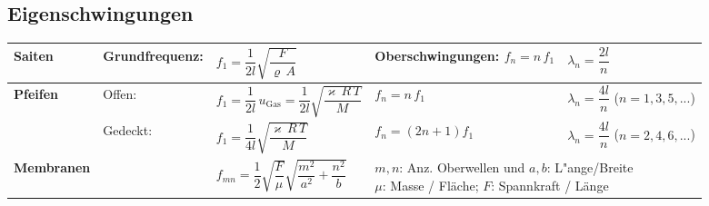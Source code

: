 \subsection{Eigenschwingungen  }
\renewcommand{\arraystretch}{2.7}
\begin{tabular}{|l|llll|}
\hline
\textbf{Saiten}
	& Grundfrequenz: 
	& $ f_1=\dfrac{1}{2l}\sqrt{\dfrac{F}{\varrho\,A}}$
	& Oberschwingungen: $ f_n=n\, f_1$
	& $\lambda_n=\dfrac{2l}{n}$\\
\hline
\textbf{Pfeifen} & Offen:
 	& $f_1=\dfrac{1}{2l}\,u_{\text{Gas}}=\dfrac{1}{2l}\sqrt{\dfrac{\varkappa\,R\,T}{M}}$ 
	& $f_n=n\, f_1$
	& $\lambda_n=\dfrac{4l}{n}$ \quad ($n=1,3,5,...$) \\
& Gedeckt: 
 	& $ f_1=\dfrac{1}{4l}\sqrt{\dfrac{\varkappa\,R\,T}{M}}$
	& $f_n=(2n+1) f_1$
	& $\lambda_n=\dfrac{4l}{n}$ \quad ($n=2,4,6,...$) \\ 
\hline
\textbf{Membranen}
 	& &
 	$f_{mn}=\dfrac{1}{2}\sqrt{\dfrac{F}{\mu}}\sqrt{\dfrac{m^2}{a^2}+\dfrac{n^2}{b}}$ 
	& \multicolumn{2}{l|}{\parbox{8cm}{$m,n$: Anz. Oberwellen und $a,b$:
	L"ange/Breite \\
	$\mu$: Masse / Fläche; $F$: Spannkraft / Länge}} \\ \hline
\end{tabular}

